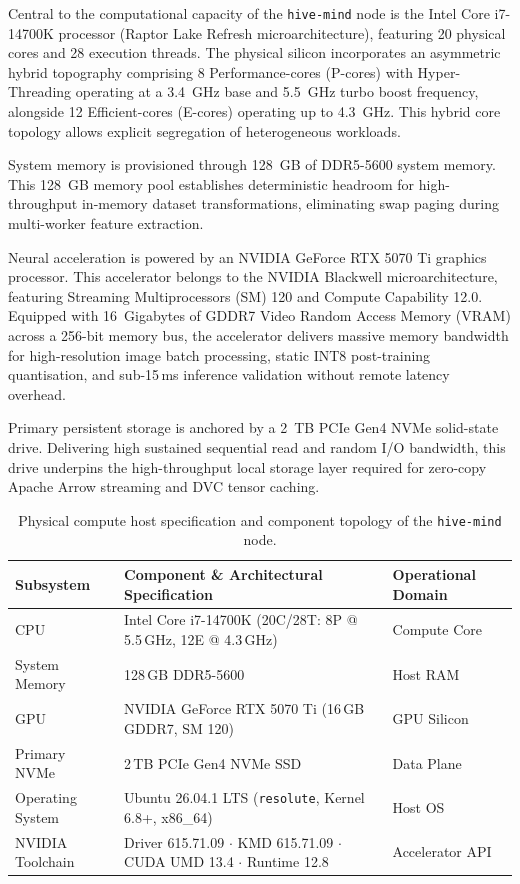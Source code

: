Central to the computational capacity of the \texttt{hive-mind} node is the Intel Core i7-14700K processor (Raptor Lake Refresh microarchitecture), featuring 20 physical cores and 28 execution threads. The physical silicon incorporates an asymmetric hybrid topography comprising 8 Performance-cores (P-cores) with Hyper-Threading operating at a 3.4~GHz base and 5.5~GHz turbo boost frequency, alongside 12 Efficient-cores (E-cores) operating up to 4.3~GHz. This hybrid core topology allows explicit segregation of heterogeneous workloads.

System memory is provisioned through 128~GB of DDR5-5600 system memory. This 128~GB memory pool establishes deterministic headroom for high-throughput in-memory dataset transformations, eliminating swap paging during multi-worker feature extraction.

Neural acceleration is powered by an NVIDIA GeForce RTX 5070 Ti graphics processor. This accelerator belongs to the NVIDIA Blackwell microarchitecture, featuring Streaming Multiprocessors (SM) 120 and Compute Capability 12.0. Equipped with 16~Gigabytes of GDDR7 Video Random Access Memory (VRAM) across a 256-bit memory bus, the accelerator delivers massive memory bandwidth for high-resolution image batch processing, static INT8 post-training quantisation, and sub-15\,ms inference validation without remote latency overhead.

Primary persistent storage is anchored by a 2~TB PCIe Gen4 NVMe solid-state drive. Delivering high sustained sequential read and random I/O bandwidth, this drive underpins the high-throughput local storage layer required for zero-copy Apache Arrow streaming and DVC tensor caching.

\begin{table}[htbp]
\centering
\small
\begin{tabularx}{\textwidth}{@{}lXl@{}}
\toprule
\textbf{Subsystem} & \textbf{Component \& Architectural Specification} & \textbf{Operational Domain} \\
\midrule
CPU & Intel Core i7-14700K (20C/28T: 8P @ 5.5\,GHz, 12E @ 4.3\,GHz) & Compute Core \\
System Memory & 128\,GB DDR5-5600 & Host RAM \\
GPU & NVIDIA GeForce RTX 5070 Ti (16\,GB GDDR7, SM 120) & GPU Silicon \\
Primary NVMe & 2\,TB PCIe Gen4 NVMe SSD & Data Plane \\
Operating System & Ubuntu 26.04.1 LTS (\texttt{resolute}, Kernel 6.8+, x86\_64) & Host OS \\
NVIDIA Toolchain & Driver 615.71.09 $\cdot$ KMD 615.71.09 $\cdot$ CUDA UMD 13.4 $\cdot$ Runtime 12.8 & Accelerator API \\
\bottomrule
\end{tabularx}
\caption{Physical compute host specification and component topology of the \texttt{hive-mind} node.}
\label{tab:hardware_topology}
\end{table}

